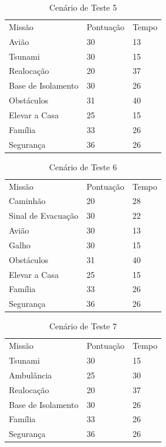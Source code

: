 \begin{table}[!h]
\centering
\caption{Cenário de Teste 5}
\label{cenario5}
\begin{tabular}{lll}
Missão             & Pontuação & Tempo \\
Avião              & 30        & 13    \\
Tsunami            & 30        & 15    \\
Realocação         & 20        & 37    \\
Base de Isolamento & 30        & 26    \\
Obstáculos         & 31        & 40    \\
Elevar a Casa      & 25        & 15    \\
Família            & 33        & 26    \\
Segurança          & 36        & 26   
\end{tabular}
\end{table}

\begin{table}[!h]
\centering
\caption{Cenário de Teste 6}
\label{cenario6}
\begin{tabular}{lll}
Missão             & Pontuação & Tempo \\
Caminhão           & 20        & 28    \\
Sinal de Evacuação & 30        & 22    \\
Avião              & 30        & 13    \\
Galho              & 30        & 15    \\
Obstáculos         & 31        & 40    \\
Elevar a Casa      & 25        & 15    \\
Família            & 33        & 26    \\
Segurança          & 36        & 26   
\end{tabular}
\end{table}

\begin{table}[!h]
\centering
\caption{Cenário de Teste 7}
\label{cenario7}
\begin{tabular}{lll}
Missão             & Pontuação & Tempo \\
Tsunami            & 30        & 15    \\
Ambulância         & 25        & 30    \\
Realocação         & 20        & 37    \\
Base de Isolamento & 30        & 26    \\
Família            & 33        & 26    \\
Segurança          & 36        & 26   
\end{tabular}
\end{table}

